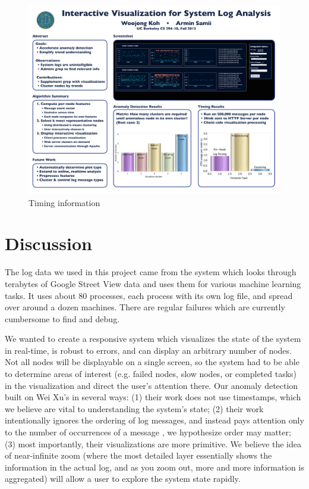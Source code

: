 \documentclass[conference]{style/acmsiggraph}
\begin{document}
\begin{figure}[p]
    \centering
    \includegraphics[width=1.0\columnwidth]{images/timing.pdf}
    \caption{Timing information}
    \label{fig:timings}
\end{figure}


\section{Discussion}

The log data we used in this project came from the system which looks through terabytes of Google
Street View data and uses them for various machine learning tasks. It uses about 80 processes, each
process with its own log file, and spread over around a dozen machines. There are regular failures
which are currently cumbersome to find and debug.

We wanted to create a responsive system which visualizes the state of the system in real-time, is
robust to errors, and can display an arbitrary number of nodes. Not all nodes will be displayable on
a single screen, so the system had to be able to determine areas of interest (e.g. failed nodes,
slow nodes, or completed tasks) in the visualization and direct the user’s attention there. Our
anomaly detection built on Wei Xu's in several ways: (1) their work does not use timestamps, which
we believe are vital to understanding the system’s state; (2) their work intentionally ignores the
ordering of log messages, and instead pays attention only to the number of occurrences of a message
, we hypothesize order may matter; (3) most importantly, their visualizations are more primitive. We
believe the idea of near-infinite zoom (where the most detailed layer essentially shows the
information in the actual log, and as you zoom out, more and more information is aggregated) will
allow a user to explore the system state rapidly.
\end{document}

